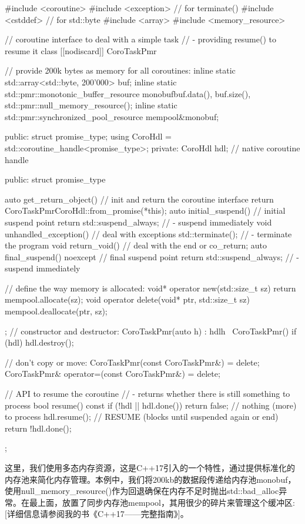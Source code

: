 \begin{cpp}
#include <coroutine>
#include <exception> // for terminate()
#include <cstddef> // for std::byte
#include <array>
#include <memory_resource>

// coroutine interface to deal with a simple task
// - providing resume() to resume it
class [[nodiscard]] CoroTaskPmr {
	// provide 200k bytes as memory for all coroutines:
	inline static std::array<std::byte, 200'000> buf;
	inline static std::pmr::monotonic_buffer_resource
		monobuf{buf.data(), buf.size(), std::pmr::null_memory_resource()};
	inline static std::pmr::synchronized_pool_resource mempool{&monobuf};

public:
	struct promise_type;
	using CoroHdl = std::coroutine_handle<promise_type>;
private:
	CoroHdl hdl; // native coroutine handle
	
public:
	struct promise_type {
		auto get_return_object() { // init and return the coroutine interface
			return CoroTaskPmr{CoroHdl::from_promise(*this)};
		}
		auto initial_suspend() { // initial suspend point
			return std::suspend_always{}; // - suspend immediately
		}
		void unhandled_exception() { // deal with exceptions
			std::terminate(); // - terminate the program
		}
		void return_void() { // deal with the end or co_return;
		}
		auto final_suspend() noexcept { // final suspend point
			return std::suspend_always{}; // - suspend immediately
		}
		
		// define the way memory is allocated:
		void* operator new(std::size_t sz) {
			return mempool.allocate(sz);
		}
		void operator delete(void* ptr, std::size_t sz) {
			mempool.deallocate(ptr, sz);
		}
	};
	// constructor and destructor:
	CoroTaskPmr(auto h) : hdl{h} { }
	~CoroTaskPmr() { if (hdl) hdl.destroy(); }
	
	// don’t copy or move:
	CoroTaskPmr(const CoroTaskPmr&) = delete;
	CoroTaskPmr& operator=(const CoroTaskPmr&) = delete;
	
	// API to resume the coroutine
	// - returns whether there is still something to process
	bool resume() const {
		if (!hdl || hdl.done()) {
			return false; // nothing (more) to process
		}
		hdl.resume(); // RESUME (blocks until suspended again or end)
		return !hdl.done();
	}
};
\end{cpp}

这里，我们使用多态内存资源，这是C++17引入的一个特性，通过提供标准化的内存池来简化内存管理。本例中，我们将200kb的数据段传递给内存池monobuf，使用null\_memory\_resource()作为回退确保在内存不足时抛出std::bad\_alloc异常。在最上面，放置了同步内存池mempool，其用很少的碎片来管理这个缓冲区:[详细信息请参阅我的书《C++17——完整指南》]。

